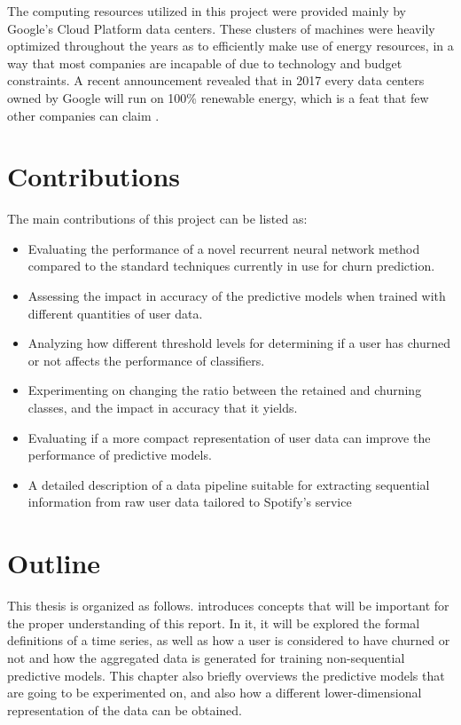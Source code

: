 \documentclass{kththesis}
\begin{document}
The computing resources utilized in this project were provided mainly by Google's Cloud Platform data centers. These clusters of machines were heavily optimized throughout the years as to efficiently make use of energy resources, in a way that most companies are incapable of due to technology and budget constraints. A recent announcement revealed that in 2017 every data centers owned by Google will run on 100\% renewable energy, which is a feat that few other companies can claim \citep{google2017renew}.  


\section{Contributions}

The main contributions of this project can be listed as:

\begin{itemize}
\item Evaluating the performance of a novel recurrent neural network method compared to the standard techniques currently in use for churn prediction.
\item Assessing the impact in accuracy of the predictive models when trained with different quantities of user data.
\item Analyzing how different threshold levels for determining if a user has churned or not affects the performance of classifiers.
\item Experimenting on changing the ratio between the retained and churning classes, and the impact in accuracy that it yields.
\item Evaluating if a more compact representation of user data can improve the performance of predictive models.
\item A detailed description of a data pipeline suitable for extracting sequential information from raw user data tailored to Spotify's service
\end{itemize}

\section{Outline}

This thesis is organized as follows.  introduces concepts that will be important for the proper understanding of this report. In it, it will be explored the formal definitions of a time series, as well as how a user is considered to have churned or not and how the aggregated data is generated for training non-sequential predictive models. This chapter also briefly overviews the predictive models that are going to be experimented on, and also how a different lower-dimensional representation of the data can be obtained.
\end{document}
